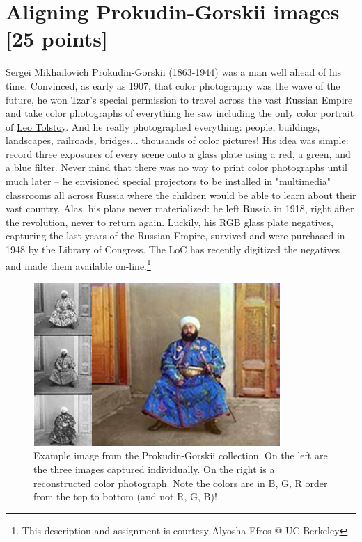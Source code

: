 \documentclass[10pt,letterpaper]{article}
\begin{document}
\section{Aligning Prokudin-Gorskii images [25 points]} 
Sergei Mikhailovich Prokudin-Gorskii (1863-1944) was a man well ahead of his time. Convinced, as early as 1907, that color photography was the wave of the future, he won Tzar's special permission to travel across the vast Russian Empire and take color photographs of everything he saw including the only color portrait of \href{https://en.wikipedia.org/wiki/Leo_Tolstoy}{Leo Tolstoy}. And he really photographed everything: people, buildings, landscapes, railroads, bridges... thousands of color pictures! His idea was simple: record three exposures of every scene onto a glass plate using a red, a green, and a blue filter. Never mind that there was no way to print color photographs until much later -- he envisioned special projectors to be installed in "multimedia" classrooms all across Russia where the children would be able to learn about their vast country. Alas, his plans never materialized: he left Russia in 1918, right after the revolution, never to return again. Luckily, his RGB glass plate negatives, capturing the last years of the Russian Empire, survived and were purchased in 1948 by the Library of Congress. The LoC has recently digitized the negatives and made them available on-line.\footnote{This description and assignment is courtesy Alyosha Efros @ UC Berkeley }
\begin{figure}[h]
\centering
\includegraphics[width=0.65\linewidth]{example-Prokudin-Gorskii.png}
\caption{\label{fig:align} Example image from the Prokudin-Gorskii collection. On the left are the three images captured individually. On the right is a reconstructed color photograph. Note the colors are in B, G, R order from the top to bottom (and not R, G, B)!}
\end{figure}
\end{document}
